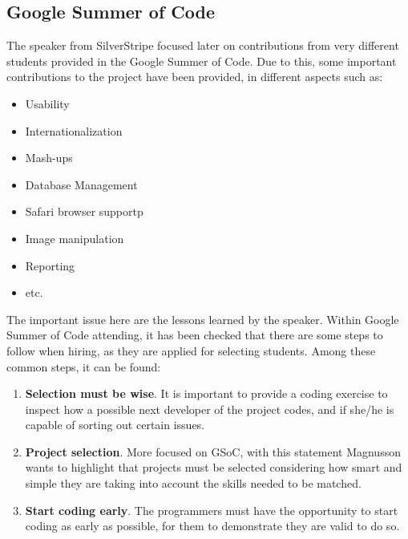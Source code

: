 \documentclass[11pt]{article}
\begin{document}
\subsection{Google Summer of Code}
The speaker from SilverStripe focused later on contributions from very different students provided in the Google Summer of Code. Due to this, some important contributions to the project have been provided, in different aspects such as:
\begin{itemize}\itemsep0pt
\item{Usability}
\item{Internationalization}
\item{Mash-ups}
\item{Database Management}
\item{Safari browser support}p
\item{Image manipulation}
\item{Reporting}
\item{etc.}
\end{itemize}
The important issue here are the lessons learned by the speaker. Within Google Summer of Code attending, it has been checked that there are some steps to follow when hiring, as they are applied for selecting students. Among these common steps, it can be found:
\begin{enumerate}\itemsep0pt
\item{\textbf{Selection must be wise}}. It is important to provide a coding exercise to inspect how a possible next developer of the project codes, and if she/he is capable of sorting out certain issues.
\item{\textbf{Project selection}}. More focused on GSoC, with this statement Magnusson wants to highlight that projects must be selected considering how smart and simple they are taking into account the skills needed to be matched.
\item{\textbf{Start coding early}}. The programmers must have the opportunity to start coding as early as possible, for them to demonstrate they are valid to do so.
\end{enumerate}
\end{document}
